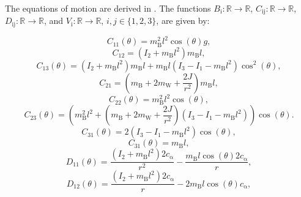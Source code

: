     The equations of motion are derived in \cite{kim2015dynamic}. The functions $B_{\mathrm{i}}: \mathbb{R} \rightarrow \mathbb{R}$, $C_{\mathrm{ij}}: \mathbb{R} \rightarrow \mathbb{R}$, $D_{\mathrm{ij}}: \mathbb{R} \rightarrow \mathbb{R}$, and $V_{\mathrm{i}}: \mathbb{R} \rightarrow \mathbb{R}$, $i,j \in \{1,2,3\}$, are given by:

    \begin{equation}
        C_{\mathrm{11}}(\theta) = m_{\mathrm{B}}^2 l^2 \cos(\theta)g,
    \end{equation}
    \begin{equation}
        C_{\mathrm{12}} = (I_{\mathrm{2}} + m_{\mathrm{B}} l^2) m_{\mathrm{B}} l,
    \end{equation}
    \begin{equation}
        C_{\mathrm{13}}(\theta) = (I_{\mathrm{2}} + m_{\mathrm{B}} l^2) m_{\mathrm{B}} l + m_{\mathrm{B}} l (I_{\mathrm{3}} - I_{\mathrm{1}} - m_{\mathrm{B}} l^2) \cos^2(\theta),
    \end{equation}
    \begin{equation}
        C_{\mathrm{21}} = (m_{\mathrm{B}} + 2m_{\mathrm{W}} + \frac{2J}{r^2}) m_{\mathrm{B}} l,
    \end{equation}
    \begin{equation}
        C_{\mathrm{22}}(\theta) = m_{\mathrm{B}}^2 l^2 \cos(\theta),
    \end{equation}
    \begin{equation}
        C_{\mathrm{23}}(\theta) = (m_{\mathrm{B}}^2 l^2 + (m_{\mathrm{B}} + 2m_{\mathrm{W}} + \frac{2J}{r^2}) (I_{\mathrm{3}} - I_{\mathrm{1}} - m_{\mathrm{B}} l^2) )\cos(\theta).
    \end{equation}
    \begin{equation}
        C_{\mathrm{31}}(\theta) = 2 (I_{\mathrm{3}} - I_{\mathrm{1}} - m_{\mathrm{B}}l^2) \cos(\theta),
    \end{equation}
    \begin{equation}
        C_{\mathrm{31}}(\theta)  = m_{\mathrm{B}} l,
    \end{equation}
    \begin{equation}
        D_{\mathrm{11}}(\theta) = \frac{(I_{\mathrm{2}} + m_{\mathrm{B}}l^2) 2c_{\mathrm{\alpha}}}{r^2} - \frac{m_{\mathrm{B}} l \cos(\theta) 2c_{\mathrm{\alpha}}}{r},
    \end{equation}
    \begin{equation}
        D_{\mathrm{12}}(\theta) = \frac{(I_{\mathrm{2}} + m_{\mathrm{B}}l^2) 2c_{\mathrm{\alpha}}}{r} - 2m_{\mathrm{B}} l \cos(\theta) c_{\mathrm{\alpha}},
    \end{equation}
